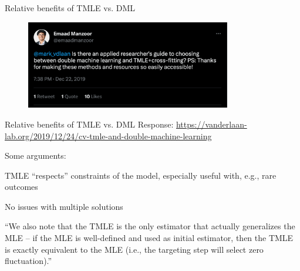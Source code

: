 \documentclass[xcolor={table}, handout]{beamer}
\begin{document}
\begin{frame}{Relative benefits of TMLE vs. DML}

\begin{figure}
\centering
\includegraphics[width = 0.8\textwidth]{../assets/tmle-dml-empirical-tweet.png}
\end{figure}
\hfill
\end{frame}


\begin{frame}{Relative benefits of TMLE vs. DML}
Response: \url{https://vanderlaan-lab.org/2019/12/24/cv-tmle-and-double-machine-learning}\pause

Some arguments: \pause
\begin{wideitemize}
\item TMLE ``respects'' constraints of the model, especially useful with, e.g., rare outcomes \citep{balzer2016estimating}\pause
\item No issues with multiple solutions\pause
\item ``We also note that the TMLE is the only estimator that actually generalizes the MLE – if the MLE is well-defined and used as initial estimator, then the TMLE is exactly equivalent to the MLE (i.e., the targeting step will select zero fluctuation).'' 
\end{wideitemize}

\end{frame}


\end{document}
